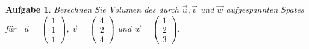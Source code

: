 \documentclass[12pt]{article}
\newtheorem{exercise}[satz]{Aufgabe}
\begin{document}
       \begin{exercise}
  Berechnen Sie Volumen des durch $\vec{u}, \vec{v}$ und $\vec{w}$ aufgespannten Spates f\"ur \,
  $\vec{u}=\left(\begin{array}{r} 1 \\ 1 \\ 1 \end{array}\right)$,
  $\vec{v}=\left(\begin{array}{r} 4 \\ 2 \\ 4 \end{array}\right)$ und
  $\vec{w}=\left(\begin{array}{r} 1 \\ 2 \\ 3 \end{array}\right)$.
   \end{exercise}
 
   
\end{document}
